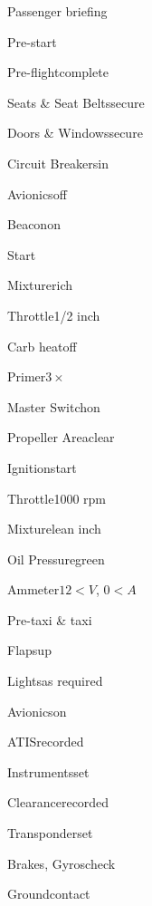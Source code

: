 





\begin{multicols}{2}
\begin{checklist}{Passenger briefing}
\end{checklist}

\begin{checklist}{Pre-start}
    \item{Pre-flight}{complete}
    \item{Seats \& Seat Belts}{secure}
    \item{Doors \& Windows}{secure}
    \item{Circuit Breakers}{in}
    \item{Avionics}{off}
    \item{Beacon}{on}
\end{checklist}

\begin{checklist}{Start}
    \item{Mixture}{rich}
    \item{Throttle}{1/2 inch}
    \item{Carb heat}{off}
    \item{Primer}{$3\times$}
    \item{Master Switch}{on}
    \item{Propeller Area}{clear}
    \item{Ignition}{start}
    \item{Throttle}{1000 rpm}
    \item{Mixture}{lean  inch}
    \item{Oil Pressure}{green}
    \item{Ammeter}{$12<V$, $0<A$}
\end{checklist}

\begin{checklist}{Pre-taxi \& taxi}
    \item{Flaps}{up}
    \item{Lights}{as required}
    \item{Avionics}{on}
    \item{ATIS}{recorded}
    \item{Instruments}{set}
    \item{Clearance}{recorded}
    \item{Transponder}{set}
    \item{Brakes, Gyros}{check}
    \item{Ground}{contact}
\end{checklist}


\end{multicols}
